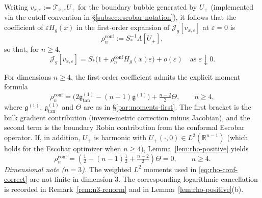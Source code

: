\documentclass[11pt,reqno,a4paper]{amsart}
\newcommand{\R}{\mathbb{R}}
\numberwithin{equation}{section}
\theoremstyle{plain}
\theoremstyle{remark}
\theoremstyle{plain}
\begin{document}
Writing $v_{x,\varepsilon}:=\mathcal T_{x,\varepsilon}U_+$ for the boundary bubble generated by $U_+$
(implemented via the cutoff convention in \S\ref{subsec:escobar-notation}), it follows that the coefficient of
$\varepsilon H_g(x)$ in the first-order expansion of $\mathcal J_g[v_{x,\varepsilon}]$
at $\varepsilon=0$ is
\[
\rho_n^{\mathrm{conf}}:=S_\ast^{-1}\Lambda[U_+],
\]
so that, for $n\ge4$,
\[
\mathcal J_g[v_{x,\varepsilon}]
= S_\ast\Big(1+\rho_n^{\mathrm{conf}}H_g(x)\varepsilon\Big)
+ o(\varepsilon)\quad\text{as }\varepsilon\downarrow0.
\]

For dimensions $n\ge4$, the first-order coefficient admits the explicit moment formula
\begin{equation}\label{eq:rho-conf-correct}
\rho_n^{\mathrm{conf}}
=\Big(2\mathfrak g^{(1)}_{\tan}-(n-1)\mathfrak g^{(1)}\Big)
+ \tfrac{n-2}{2}\Theta,
\qquad n\ge4,
\end{equation}
where $\mathfrak g^{(1)}$, $\mathfrak g^{(1)}_{\tan}$ and $\Theta$ are as in
\S\ref{par:moments-first}. The first bracket is the bulk gradient contribution
(inverse-metric correction minus Jacobian), and the second term is the boundary
Robin contribution from the conformal Escobar operator.
If, in addition, $U_+$ is harmonic with
$U_+(\cdot,0)\in L^2(\R^{n-1})$ (which holds for the Escobar optimizer when $n\ge4$),
Lemma~\ref{lem:rho-positive} yields
\[
\rho_n^{\mathrm{conf}}
=\left(\tfrac12-(n-1)\tfrac12+\tfrac{n-2}{2}\right)\Theta
=0,\qquad n\ge4.
\]
\smallskip
\noindent\emph{Dimensional note ($n=3$).}
The weighted $L^2$ moments used in \eqref{eq:rho-conf-correct} are not finite
in dimension $3$.  The corresponding logarithmic cancellation is recorded in
Remark~\ref{rem:n3-renorm} and in Lemma~\ref{lem:rho-positive}\textup{(b)}.
\end{document}
